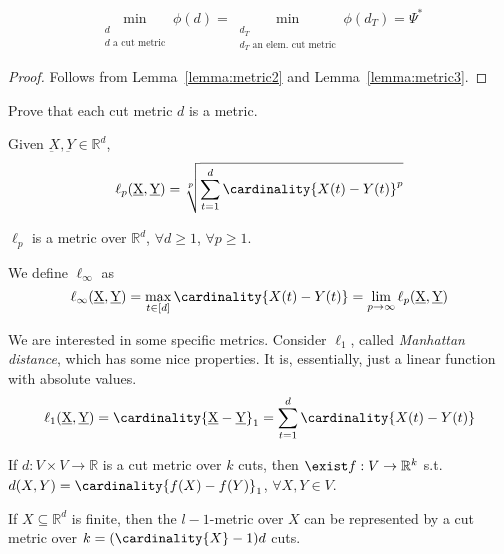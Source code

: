     \begin{corollary}
        \[ \min_{\substack{d\\ d \text{  a cut metric}}} \phi(d) = \min_{\substack{d_T\\ d_T \text{ an elem. cut metric}}} \phi(d_T) = \Psi^*  \]
    \end{corollary}

    \begin{proof}
        Follows from Lemma~\ref{lemma:metric2} and Lemma~\ref{lemma:metric3}.
    \end{proof}

    \begin{exercise}
        Prove that each cut metric $d$ is a metric.
    \end{exercise}

    \begin{definition}
        Given $\underbar{X}, \underbar{Y} \in \mathbb{R}^d$,
        \[ \ell_p(\underbar{X}, \underbar{Y}) = \sqrt[p]{\sum_{t=1}^{d} \cardinality{X(t) - Y(t)}^p} \]
    \end{definition}

    \begin{theorem}
        $\ell_p$ is a metric over $\mathbb{R}^d$, $\forall d \geq 1$, $\forall p \geq 1$.
    \end{theorem}

    We define $\ell_\infty$ as
    \[ \ell_\infty(\underbar{X}, \underbar{Y}) = \max_{t \in [d]} \cardinality{X(t) - Y(t)} = \lim_{p \rightarrow \infty} \ell_p(\underbar{X}, \underbar{Y}) \]

    We are interested in some specific metrics.
    Consider $\ell_1$, called \textit{Manhattan distance}, which has some nice properties.
    It is, essentially, just a linear function with absolute values.
    \[ \ell_1(\underbar{X}, \underbar{Y}) = \cardinality{\underbar{X} - \underbar{Y}}_1 = \sum_{t=1}^{d} \cardinality{X(t) - Y(t)} \]

    \begin{lemma}\label{lemma:metric4}
        If $d : V \times V \rightarrow \mathbb{R}$ is a cut metric over $k$ cuts, then $\exist f : V \rightarrow \mathbb{R}^k$ s.t. $d(X,Y) = \cardinality{f(X) - f(Y)}_1$, $\forall X,Y \in V$.

        If $X \subseteq \mathbb{R}^d$ is finite, then the $l-1$-metric over $X$ can be represented by a cut metric over $k = (\cardinality{X}-1)d$ cuts.
    \end{lemma}

